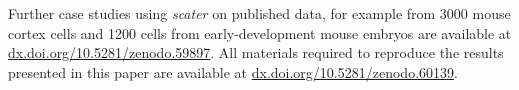 \documentclass[10pt,letterpaper]{article}
\begin{document}
Further case studies using \emph{scater} on published data, for example from 3000 mouse cortex cells \citep{Zeisel2015-ab} and 1200 cells from early-development mouse embryos \citep{Scialdone2016-oa} are available at \href{http://dx.doi.org/10.5281/zenodo.59897}{dx.doi.org/10.5281/zenodo.59897}. All materials required to reproduce the results presented in this paper are available at \href{http://dx.doi.org/10.5281/zenodo.60139}{dx.doi.org/10.5281/zenodo.60139}.





\end{document}
